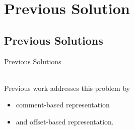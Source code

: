 \documentclass[]{beamer}
\begin{document}
\section{Previous Solution}
\subsection{Previous Solutions}
\begin{frame}{\centerline{Previous Solutions}}
  \ \\
  \fontsize{13.5}{11}\selectfont Previous work addresses this problem by
  \begin{itemize}
  \item comment-based representation
  \item and offset-based representation.
  \end{itemize}
\end{frame}
\end{document}
